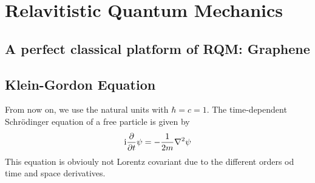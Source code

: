 \chapter{Relavitistic Quantum Mechanics}


\section{A perfect classical platform of RQM: Graphene}




\section{Klein-Gordon Equation}
From now on, we use the natural units with $\hbar = c = 1$.
The time-dependent Schrödinger equation of a free particle is given by 
\begin{align}
    \mathrm{i}  \frac{\partial }{\partial t} \psi = - \frac{1}{2m} \nabla^2 \psi
\end{align}
This equation is obviouly not Lorentz covariant due to the different orders od time and space derivatives.


